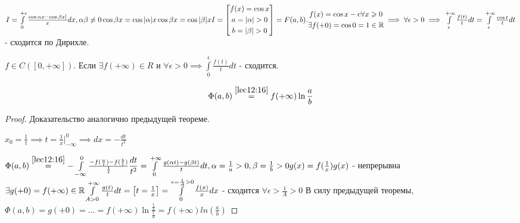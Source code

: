 \documentclass[../../main.tex]{subfiles}
\begin{document}
	\begin{exmp}
		$I = \int\limits_0^{+\epsilon} \frac{\cos \alpha x - \cos \beta x]}{x} dx, \alpha\beta \neq 0
		\\
		\cos \beta x = \cos |\alpha| x
		\\
		\cos \beta x = \cos |\beta| x
		\\
		I = \left[ \begin{gathered} f(x) = \cos x \\ a = |\alpha| > 0 \\ b = |\beta| > 0 \end{gathered} \right]
		= F(a, b).
		\\ 
		\begin{gathered} f(x) = \cos x  - \textup{c} \forall x \geqslant 0 \\ \exists f(+0) = \cos 0 = 1 \in \mathbb{R} \end{gathered} \implies \forall \epsilon > 0 \implies \int\limits_{\epsilon}^{+\infty} \frac{f(t)}{t} dt = \int\limits_{\epsilon}^{+\infty} \frac{\cos t}{t} dt$ - сходится по Дирихле.
	\end{exmp}

	\begin{thm}
		$f \in C([0, +\infty])$. Если $\exists f(+\infty) \in R$ и  $\forall \epsilon > 0 \implies \int\limits_0^{\epsilon} \frac{f(t)}{t} dt$ - сходится.
		
		\begin{equation}
			\label{lab13:20}
			\Phi(a, b) \stk{lec12:16}= f(+\infty) \ln \frac{a}{b}
		\end{equation}
	\end{thm}

	\begin{proof}
		Доказательство аналогично предыдущей теореме.
		
		$x_0 = \frac{1}{t} \implies t = \frac{1}{x}|^0_{-\infty} \implies dx = - \frac{dt}{t^2}$
		
		$\Phi(a, b) \stk{lec12:16} = - \int\limits_{-\infty}^0 \frac{-f(\frac{a}{t})-f(\frac{b}{t})}{\frac{1}{t}} \dfrac{dt}{t^2} = \int\limits_0^{+\infty} \frac{g(\alpha t) - g(\beta t)}{t} dt, 
		\\
		\alpha = \frac{1}{a} > 0, \beta = \frac{1}{b} > 0
		\\
		g(x) = f(\frac{1}{x})
		\\
		g(x)$ - непрерывна
		$
		\exists g(+0) = f(+\infty) \in \mathbb{R}
		\\
		\int\limits_{A > 0}^{+\infty} \frac{g(t)}{t} dt = \left[ t = \frac{1}{x} \right] = \int\limits_0^{\epsilon = \frac{1}{A} > 0} \frac{f(x)}{x} dx$ - сходится $\forall \epsilon > \frac{1}{A} > 0 $
		В силу предыдущей теоремы, $\Phi(a, b) = g(+0) = \ldots = f(+\infty) \ln \frac{\frac{1}{b}}{\frac{1}{a}} = f(+\infty) ln (\frac{a}{b})$
	\end{proof}
\end{document}
